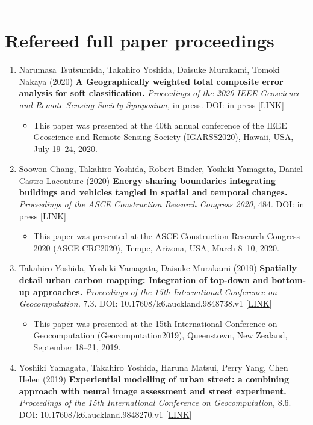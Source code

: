\documentclass[]{book}
\providecommand{\tightlist}{%
  \setlength{\itemsep}{0pt}\setlength{\parskip}{0pt}}
\begin{document}
\begin{center}\rule{0.5\linewidth}{\linethickness}\end{center}

\hypertarget{refereed-full-paper-proceedings}{%
\section*{Refereed full paper proceedings}\label{refereed-full-paper-proceedings}}

\begin{enumerate}
\def\labelenumi{\arabic{enumi}.}
\tightlist
\item
  Narumasa Tsutsumida, Takahiro Yoshida, Daisuke Murakami, Tomoki Nakaya (2020)
  \textbf{A Geographically weighted total composite error analysis for soft classification.}
  \emph{Proceedings of the 2020 IEEE Geoscience and Remote Sensing Society Symposium,} in press.
  DOI: in press {[}LINK{]}

  \begin{itemize}
  \tightlist
  \item
    This paper was presented at the 40th annual conference of the IEEE Geoscience and Remote Sensing Society (IGARSS2020), Hawaii, USA, July 19--24, 2020.
  \end{itemize}
\item
  Soowon Chang, Takahiro Yoshida, Robert Binder, Yoshiki Yamagata, Daniel Castro-Lacouture (2020)
  \textbf{Energy sharing boundaries integrating buildings and vehicles tangled in spatial and temporal changes.}
  \emph{Proceedings of the ASCE Construction Research Congress 2020,} 484.
  DOI: in press {[}LINK{]}

  \begin{itemize}
  \tightlist
  \item
    This paper was presented at the ASCE Construction Research Congress 2020 (ASCE CRC2020), Tempe, Arizona, USA, March 8--10, 2020.
  \end{itemize}
\item
  Takahiro Yoshida, Yoshiki Yamagata, Daisuke Murakami (2019)
  \textbf{Spatially detail urban carbon mapping: Integration of top-down and bottom-up approaches.}
  \emph{Proceedings of the 15th International Conference on Geocomputation,} 7.3.
  DOI: 10.17608/k6.auckland.9848738.v1 {[}\href{https://doi.org/10.17608/k6.auckland.9848738.v1}{LINK}{]}

  \begin{itemize}
  \tightlist
  \item
    This paper was presented at the 15th International Conference on Geocomputation (Geocomputation2019), Queenstown, New Zealand, September 18--21, 2019.
  \end{itemize}
\item
  Yoshiki Yamagata, Takahiro Yoshida, Haruna Matsui, Perry Yang, Chen Helen (2019)
  \textbf{Experiential modelling of urban street: a combining approach with neural image assessment and street experiment.}
  \emph{Proceedings of the 15th International Conference on Geocomputation,} 8.6.
  DOI: 10.17608/k6.auckland.9848270.v1 {[}\href{https://doi.org/10.17608/k6.auckland.9848270.v1}{LINK}{]}


\end{enumerate}
\end{document}
